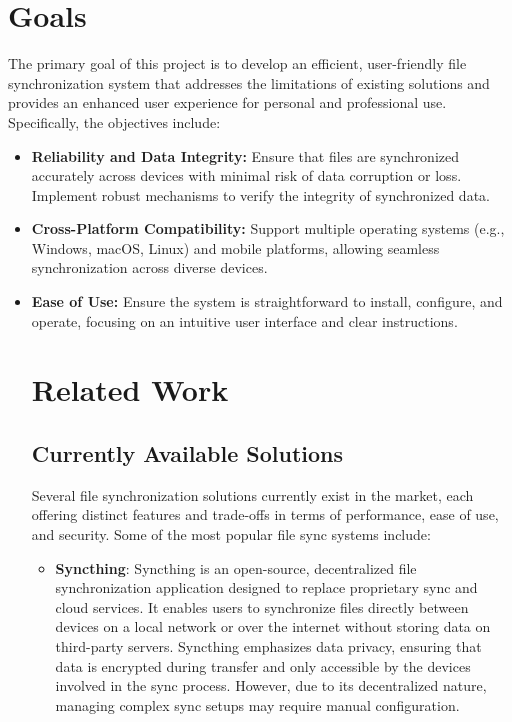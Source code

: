 \documentclass{book}
\begin{document}
    \section{Goals}
      The primary goal of this project is to develop an efficient, user-friendly file synchronization system that addresses the limitations of existing solutions and provides an enhanced user experience for personal and professional use. Specifically, the objectives include:
      \begin{itemize}
        \item \textbf{Reliability and Data Integrity:} Ensure that files are synchronized accurately across devices with minimal risk of data corruption or loss. Implement robust mechanisms to verify the         integrity of synchronized data.
        
        \item \textbf{Cross-Platform Compatibility:} Support multiple operating systems (e.g., Windows, macOS, Linux) and mobile platforms, allowing seamless synchronization across diverse devices.
		    \item \textbf{Ease of Use:} Ensure the system is straightforward to install, configure, and operate, focusing on an intuitive user interface and clear instructions.

    \section{Related Work}
			\subsection{Currently Available Solutions}
        Several file synchronization solutions currently exist in the market, each offering distinct features and trade-offs in terms of performance, ease of use, and security. Some of the most popular file sync systems include:

    \begin{itemize}
      \item \textbf{Syncthing}: Syncthing is an open-source, decentralized file synchronization application designed to replace proprietary sync and cloud services. It enables users to synchronize files directly between devices on a local network or over the internet without storing data on third-party servers. Syncthing emphasizes data privacy, ensuring that data is encrypted during transfer and only accessible by the devices involved in the sync process. However, due to its decentralized nature, managing complex sync setups may require manual configuration.


\end{itemize}
\end{itemize}
\end{document}
